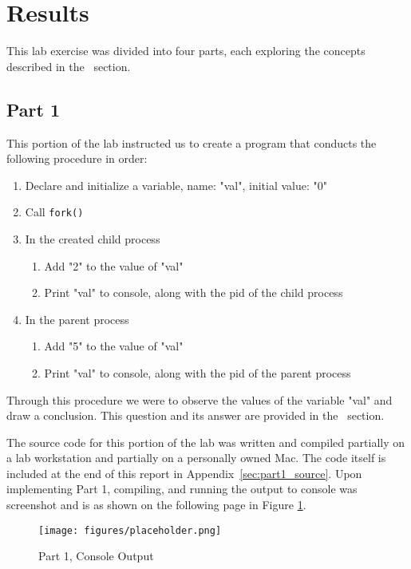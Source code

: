 
\section{Results}\label{sec:results}
    This lab exercise was divided into four parts, each exploring the concepts described in the~ section.



    \subsection{Part 1}\label{subsec:part1}
        This portion of the lab instructed us to create a program that conducts the following procedure in order:

        \begin{enumerate}
            \itemsep0em
            \item Declare and initialize a variable, name: "val", initial value: "0"
            \item Call \texttt{fork()}
            \item In the created child process
            \begin{enumerate}
                \itemsep0em
                \item Add "2" to the value of "val"
                \item Print "val" to console, along with the pid of the child process
            \end{enumerate}
            \item In the parent process
            \begin{enumerate}
                \itemsep0em
                \item Add "5" to the value of "val"
                \item Print "val" to console, along with the pid of the parent process
            \end{enumerate}
        \end{enumerate}
        Through this procedure we were to observe the values of the variable "val" and draw a conclusion.
        This question and its answer are provided in the~ section.

        \medskip
        \noindent The source code for this portion of the lab was written and compiled partially on a lab workstation and partially on a personally owned Mac.
        The code itself is included at the end of this report in Appendix~\ref{sec:part1_source}.
        Upon implementing Part 1, compiling, and running the output to console was screenshot and is as shown on the following page in Figure \ref{fig:part1_output}.

        \begin{figure}[H]
            \centering
            \texttt{[image: figures/placeholder.png]}
            \caption{Part 1, Console Output}
            \label{fig:part1_output}
        \end{figure}
